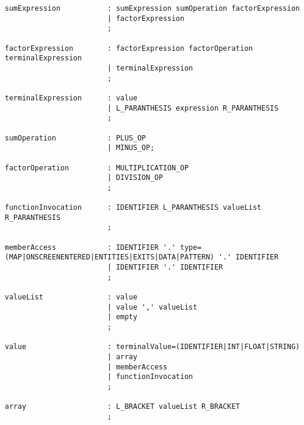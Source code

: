 \begin{lstlisting}[language=CSharp, caption={The grammar for \dazel}, label={lst:DazelGrammar},escapechar=~]
sumExpression           : sumExpression sumOperation factorExpression
                        | factorExpression
                        ;

factorExpression        : factorExpression factorOperation terminalExpression
                        | terminalExpression
                        ;

terminalExpression      : value
	                    | L_PARANTHESIS expression R_PARANTHESIS
                        ;

sumOperation            : PLUS_OP 
                        | MINUS_OP;

factorOperation         : MULTIPLICATION_OP 
                        | DIVISION_OP
                        ;

functionInvocation      : IDENTIFIER L_PARANTHESIS valueList R_PARANTHESIS
                        ;

memberAccess            : IDENTIFIER '.' type=(MAP|ONSCREENENTERED|ENTITIES|EXITS|DATA|PATTERN) '.' IDENTIFIER
                        | IDENTIFIER '.' IDENTIFIER
                        ;

valueList               : value
                        | value ',' valueList
                        | empty
                        ;

value                   : terminalValue=(IDENTIFIER|INT|FLOAT|STRING)
                        | array
                        | memberAccess
                        | functionInvocation
                        ;

array                   : L_BRACKET valueList R_BRACKET
                        ;
\end{lstlisting}

